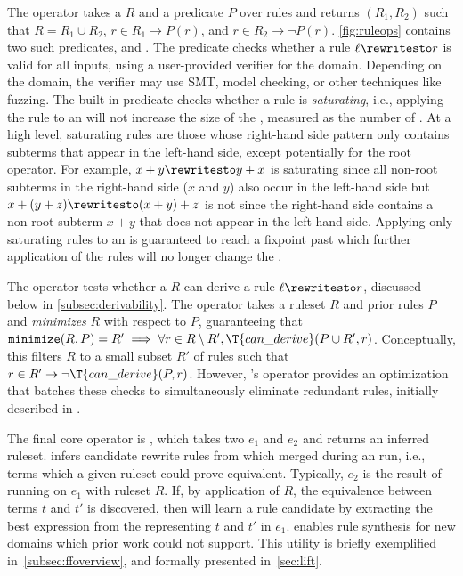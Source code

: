The  operator takes a  $R$
  and a predicate $P$ over rules and
  returns $(R_1, R_2)$ such that
  $R = R_1 \cup R_2$,
  $r \in R_1 \rightarrow P(r)$, and
  $r \in R_2 \rightarrow \neg P(r)$.
\autoref{fig:ruleops}
 contains two such predicates,  and .
The  predicate
 checks whether a rule $\ell \rewritesto r$
 is valid for all inputs,
 using a user-provided verifier
 for the domain.
Depending on the domain,
 the verifier may use SMT, model checking,
 or other techniques like fuzzing.
The built-in  predicate
 checks whether a rule is \textit{saturating},
 i.e., applying the rule to an \egraph
 will not increase the size of the \egraph,
 measured as the number of \eclasses.
At a high level,
  saturating rules are those whose right-hand side pattern
  only contains subterms that appear in the left-hand side,
  except potentially for the root operator.
For example,
  $x + y \rewritesto y + x$ is saturating
  since all non-root subterms in the right-hand side ($x$ and $y$) also
  occur in the left-hand side but
  $x + (y + z) \rewritesto (x + y) + z$ is not
  since the right-hand side contains a non-root subterm $x + y$
  that does not appear in the left-hand side.
Applying only saturating rules
  to an \egraph
  is guaranteed to reach a fixpoint
  past which further application of the rules
  will no longer change the \egraph.

The  operator
 tests whether a  $R$
 can derive a rule $\ell \rewritesto r$,
 discussed below in \autoref{subsec:derivability}.
The  operator
 takes a ruleset $R$ and prior rules $P$
 and \textit{minimizes} $R$ with respect to $P$,
 guaranteeing that $
  \mathtt{minimize}(R, P) = R' \implies
  \forall r \in R \setminus R',
  \T{can\_derive}(P \cup R', r)
 $.
Conceptually,
 this filters $R$ to a small subset $R'$ of rules
 such that $r \in R' \rightarrow \neg \T{can\_derive}(P, r)$.
However, \enumo's  operator provides
 an optimization that batches these checks to simultaneously
 eliminate redundant rules, initially described in \citet{ruler}.

The final core operator
  is ,
  which takes two \egraphs $e_1$ and $e_2$ and
  returns an inferred ruleset.
  infers candidate rewrite rules from
  \eclasses which merged during an \eqsat run,
  i.e., terms which a given ruleset could prove equivalent.
Typically, $e_2$ is the result of
  running \eqsat on $e_1$ with ruleset $R$.
If, by application of $R$, the equivalence between
  terms $t$ and $t'$ is discovered,
  then  will learn a
  rule candidate by extracting the best expression from the \eclasses
  representing $t$ and $t'$ in $e_1$.
 enables rule synthesis for new domains
  which prior work could not support. This utility is
  briefly exemplified in~\autoref{subsec:ffoverview},
  and formally presented in~\autoref{sec:lift}.

